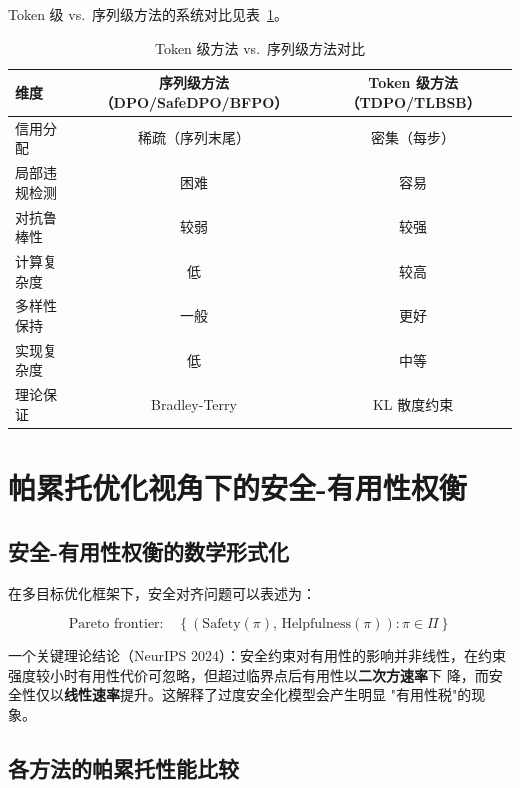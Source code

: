 \documentclass[12pt,a4paper,UTF8]{ctexart}
\begin{document}
Token 级 vs.\ 序列级方法的系统对比见表~\ref{tab:token_vs_seq}。

\begin{table}[H]
  \centering
  \caption{Token 级方法 vs.\ 序列级方法对比}
  \label{tab:token_vs_seq}
  \small
  \begin{tabular}{lcc}
    \toprule
    \textbf{维度} & \textbf{序列级方法（DPO/SafeDPO/BFPO）} & \textbf{Token 级方法（TDPO/TLBSB）} \\
    \midrule
    信用分配 & 稀疏（序列末尾） & 密集（每步） \\
    局部违规检测 & 困难 & 容易 \\
    对抗鲁棒性 & 较弱 & 较强 \\
    计算复杂度 & 低 & 较高 \\
    多样性保持 & 一般 & 更好 \\
    实现复杂度 & 低 & 中等 \\
    理论保证 & Bradley-Terry & KL 散度约束 \\
    \bottomrule
  \end{tabular}
\end{table}

\section{帕累托优化视角下的安全-有用性权衡}
\label{sec:pareto}

\subsection{安全-有用性权衡的数学形式化}

在多目标优化框架下，安全对齐问题可以表述为：

\begin{equation}
  \text{Pareto frontier:}\quad
  \left\{(\mathrm{Safety}(\pi),\,\mathrm{Helpfulness}(\pi)) : \pi\in\Pi\right\}
\end{equation}

一个关键理论结论（NeurIPS 2024）：安全约束对有用性的影响并非线性，在约束
强度较小时有用性代价可忽略，但超过临界点后有用性以\textbf{二次方速率}下
降，而安全性仅以\textbf{线性速率}提升。这解释了过度安全化模型会产生明显
"有用性税"的现象。

\subsection{各方法的帕累托性能比较}
\end{document}
